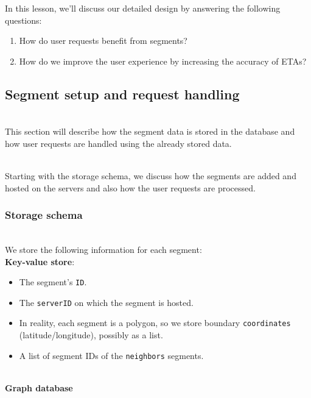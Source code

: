 

In this lesson, we'll discuss our detailed design by answering the following questions:

\begin{enumerate}
\item
\protect{}\label{qPVuc2EQntMrcPuut5mM8}
How do user requests benefit from segments?
\item
\protect{}\label{lGuP5Gnpf1y0UUjrlj2Ez}
How do we improve the user experience by increasing the accuracy of ETAs?
\end{enumerate}

\subsection{Segment setup and request handling}\label{7yE8E_9SV1BEh0wRXH_Df}
\\
This section will describe how the segment data is stored in the database and how user requests are handled using the already stored data.\\
\strut \\
Starting with the storage schema, we discuss how the segments are added and hosted on the servers and also how the user requests are processed.

\subsubsection{Storage schema}\label{mIp9Ck897FnJuTH8HxpD_}
\\
We store the following information for each segment:
\\
\textbf{Key-value store}:

\begin{itemize}
\item
\protect{}\label{tq-iT4EIFUobRafnY8RR1}
The segment's \texttt{ID}.
\item
\protect{}\label{-00Jm48oN8sF72QbWVpSm}
The \texttt{serverID} on which the segment is hosted.
\item
\protect{}\label{fmOIJpz2mvFKE1IwCO8S_}
In reality, each segment is a polygon, so we store boundary \texttt{coordinates} (latitude/longitude), possibly as a list.
\item
\protect{}\label{GUmF65lsZERc1XO0tHd_j}
A list of segment IDs of the \texttt{neighbors} segments.
\end{itemize}
\\
\textbf{Graph database}

